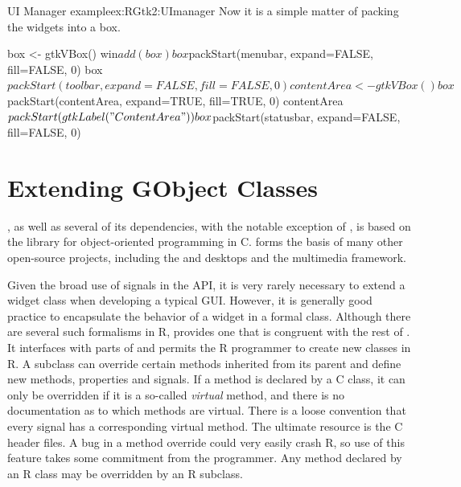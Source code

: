 \begin{example}{UI Manager example}{ex:RGtk2:UImanager}
Now it is a simple matter of packing the widgets into a box.
\begin{Schunk}
\begin{Sinput}
 box <- gtkVBox()
 win$add(box)
 box$packStart(menubar, expand=FALSE, fill=FALSE, 0)
 box$packStart(toolbar, expand=FALSE, fill= FALSE, 0)
 contentArea <- gtkVBox()
 box$packStart(contentArea, expand=TRUE, fill=TRUE, 0)
 contentArea$packStart(gtkLabel("Content Area"))
 box$packStart(statusbar, expand=FALSE, fill=FALSE, 0)
\end{Sinput}
\end{Schunk}

\end{example}


\chapter{Extending GObject Classes}
\label{chapter:extending-GTK}
\label{sec:gtk:extending-classes}

\GTK, as well as several of its dependencies, with the notable
exception of , is based on the 
library for object-oriented programming in C.  forms the
basis of many other open-source projects, including the 
and  desktops and the  multimedia framework.

Given the broad use of signals in the \GTK\/ API, it is very rarely
necessary to extend a widget class when developing a typical
GUI. However, it is generally good practice to encapsulate the
behavior of a widget in a formal class. Although there are several
such formalisms in R,  provides one that is congruent with
the rest of \GTK. It interfaces with parts of  and
permits the R programmer to create new  classes in R. A
subclass can override certain methods inherited from its parent and
define new methods, properties and signals. If a method is declared by
a C class, it can only be overridden if it is a so-called
\textit{virtual} method, and there is no documentation as to which
methods are virtual. There is a loose convention that every signal has
a corresponding virtual method. The ultimate resource is the C header
files. A bug in a method override could very easily crash R, so use of
this feature takes some commitment from the programmer. Any method
declared by an R class may be overridden by an R subclass.

